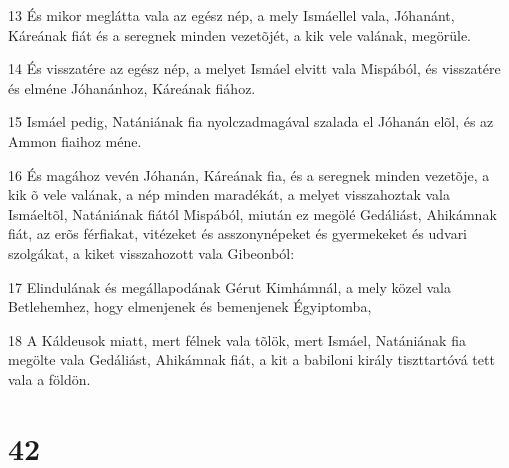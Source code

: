 \par 13 És mikor meglátta vala az egész nép, a mely Ismáellel vala, Jóhanánt, Káreának fiát és a seregnek minden vezetõjét, a kik vele valának, megörüle.
\par 14 És visszatére az egész nép, a melyet Ismáel elvitt vala Mispából, és visszatére és elméne Jóhanánhoz, Káreának fiához.
\par 15 Ismáel pedig, Natániának fia nyolczadmagával szalada el Jóhanán elõl, és az Ammon fiaihoz méne.
\par 16 És magához vevén Jóhanán, Káreának fia, és a seregnek minden vezetõje, a kik õ vele valának, a nép minden maradékát, a melyet visszahoztak vala Ismáeltõl, Natániának fiától Mispából, miután ez megölé Gedáliást, Ahikámnak fiát, az erõs férfiakat, vitézeket és asszonynépeket és gyermekeket és udvari szolgákat, a kiket visszahozott vala Gibeonból:
\par 17 Elindulának és megállapodának Gérut Kimhámnál, a mely közel vala Betlehemhez, hogy elmenjenek és bemenjenek Égyiptomba,
\par 18 A Káldeusok miatt, mert félnek vala tõlök, mert Ismáel, Natániának fia megölte vala Gedáliást, Ahikámnak fiát, a kit a babiloni király tiszttartóvá tett vala a földön.

\chapter{42}

